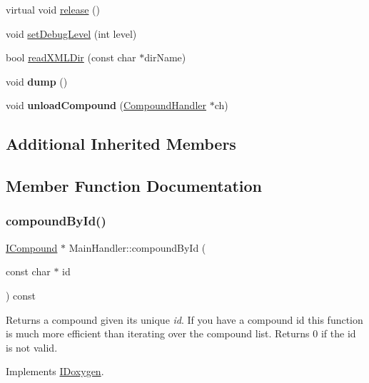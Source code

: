 \begin{DoxyCompactItemize}
virtual void \mbox{\hyperlink{class_main_handler_a1f9507df93308fe3002cc2d97bd8c8be}{release}} ()
\item 
void \mbox{\hyperlink{class_main_handler_a4856c87039eb9235d0fa7e10d8912e55}{set\+Debug\+Level}} (int level)
\item 
bool \mbox{\hyperlink{class_main_handler_a09e7e0c5e69be2b2aa5dc91cb77721d8}{read\+X\+M\+L\+Dir}} (const char $\ast$dir\+Name)
\item 
\mbox{\label{class_main_handler_a0994106c1d348299b85539d6a135a1ec}} 
void {\bfseries dump} ()
\item 
\mbox{\label{class_main_handler_ad937ec7a5c9da61ca1c96af46402abb9}} 
void {\bfseries unload\+Compound} (\mbox{\hyperlink{class_compound_handler}{Compound\+Handler}} $\ast$ch)
\end{DoxyCompactItemize}
\subsection*{Additional Inherited Members}


\subsection{Member Function Documentation}
\mbox{\label{class_main_handler_a126390d35459251f392ebcd1cd659cda}} 
\subsubsection{\texorpdfstring{compoundById()}{compoundById()}}
{\footnotesize\ttfamily \mbox{\hyperlink{class_i_compound}{I\+Compound}} $\ast$ Main\+Handler\+::compound\+By\+Id (\begin{DoxyParamCaption}\item[{const char $\ast$}]{id }\end{DoxyParamCaption}) const\hspace{0.3cm}{\ttfamily [virtual]}}

Returns a compound given its unique {\itshape id}. If you have a compound id this function is much more efficient than iterating over the compound list. Returns 0 if the id is not valid. 

Implements \mbox{\hyperlink{class_i_doxygen_aec9e0df2a3c6a8085358ff0f07c52c55}{I\+Doxygen}}.


